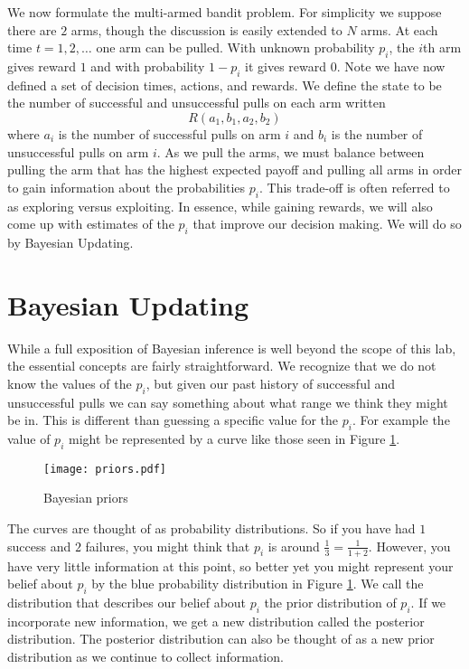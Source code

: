We now formulate the multi-armed bandit problem.  
For simplicity we suppose there are $2$ arms, though the 
discussion is easily extended to $N$ arms.  
At each time $t= 1,2,\ldots$ one arm can be pulled.  
With unknown probability $p_i$, the $i$th arm gives 
reward $1$ and with probability $1-p_i$ it gives reward $0$.  
Note we have now defined a set of decision times, actions, and rewards. 
We define the state to be the number of successful and unsuccessful 
pulls on each arm written
\begin{equation}\label{state}
R(a_1,b_1,a_2,b_2)
\end{equation}
where $a_i$ is the number of successful pulls on arm $i$ and $b_i$ 
is the number of unsuccessful pulls on arm $i$.
As we pull the arms, we must balance between pulling the arm that has 
the highest expected payoff and pulling all arms in order to gain 
information about the probabilities $p_i$.  
This trade-off is often referred to as exploring versus exploiting.  
In essence, while gaining rewards, we will also come up with 
estimates of the $p_i$ that improve our decision making.  
We will do so by Bayesian Updating.

\section*{Bayesian Updating}
While a full exposition of Bayesian inference is well beyond the 
scope of this lab, the essential concepts are fairly straightforward.  
We recognize that we do not know the values of the $p_i$, 
but given our past history of successful and unsuccessful 
pulls we can say something about what range we think they might be in. 
This is different than guessing a specific value for the $p_i$.
For example the value of $p_i$ might be represented by a curve 
like those seen in Figure \ref{fig:priors}.
\begin{figure}

\centering
\texttt{[image: priors.pdf]}
\caption{Bayesian priors}
\label{fig:priors}
\end{figure}
The curves are thought of as probability distributions.  
So if you have had $1$ success and $2$ failures, you might 
think that $p_i$ is around $\frac{1}{3} = \frac{1}{1+2}$. 
However, you have very little information at this point, 
so better yet you might represent your belief about $p_i$ 
by the blue probability distribution in Figure \ref{fig:priors}.  
We call the distribution that describes our belief about $p_i$ 
the prior distribution of $p_i$.  If we incorporate new information, 
we get a new distribution called the posterior distribution.  
The posterior distribution can also be thought of as a new prior 
distribution as we continue to collect information.

